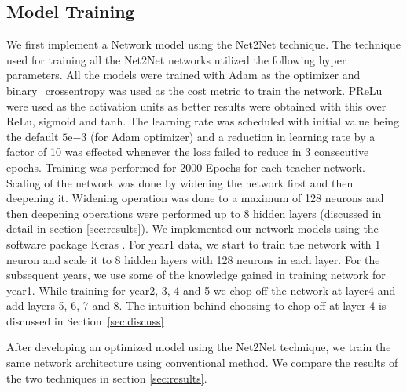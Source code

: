 \subsection{Model Training}

We first implement a Network model using the Net2Net technique. The technique used for training all the Net2Net networks utilized the following hyper parameters. All the models were trained with Adam as the optimizer and binary\_crossentropy was used as the cost metric to train the network. PReLu were used as the activation units as better results were obtained with this over ReLu, sigmoid and tanh. The learning rate was scheduled with initial value being the default $5\mathrm{e}{-3}$ (for Adam optimizer) and a reduction in learning rate by a factor of 10 was effected whenever the loss failed to reduce in 3 consecutive epochs. Training was performed for 2000 Epochs for each teacher network. Scaling of the network was done by widening the network first and then deepening it. Widening operation was done to a maximum of 128 neurons and then deepening operations were performed up to 8 hidden layers (discussed in detail in section \ref{sec:results}). We implemented our network models using the software package Keras \cite{chollet2015keras}. For year1 data, we start to train the network with 1 neuron and scale it to 8 hidden layers with 128 neurons in each layer. For the subsequent years, we use some of the knowledge gained in training network for year1. While training for year2, 3, 4 and 5 we chop off the network at layer4 and add layers 5, 6, 7 and 8. The intuition behind choosing to chop off at layer 4 is discussed in Section~\ref{sec:discuss}

After developing an optimized model using the Net2Net technique, we train the same network architecture using conventional method. We compare the results of the two techniques in section \ref{sec:results}. 

